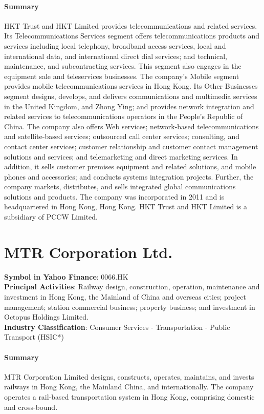 \paragraph{Summary}
HKT Trust and HKT Limited provides telecommunications and related services. Its Telecommunications Services segment offers telecommunications products and services including local telephony, broadband access services, local and international data, and international direct dial services; and technical, maintenance, and subcontracting services. This segment also engages in the equipment sale and teleservices businesses. The company's Mobile segment provides mobile telecommunications services in Hong Kong. Its Other Businesses segment designs, develops, and delivers communications and multimedia services in the United Kingdom, and Zhong Ying; and provides network integration and related services to telecommunications operators in the People's Republic of China. The company also offers Web services; network-based telecommunications and satellite-based services; outsourced call center services; consulting, and contact center services; customer relationship and customer contact management solutions and services; and telemarketing and direct marketing services. In addition, it sells customer premises equipment and related solutions, and mobile phones and accessories; and conducts systems integration projects. Further, the company markets, distributes, and sells integrated global communications solutions and products. The company was incorporated in 2011 and is headquartered in Hong Kong, Hong Kong. HKT Trust and HKT Limited is a subsidiary of PCCW Limited.


\section{MTR Corporation Ltd.}
\textbf{Symbol in Yahoo Finance}: 0066.HK\\
\textbf{Principal Activities}: Railway design, construction, operation, maintenance and investment in Hong Kong, the Mainland of China and overseas cities; project management; station commercial business; property business; and investment in Octopus Holdings Limited.\\
\textbf{Industry Classification}: Consumer Services - Transportation - Public Transport (HSIC*)
\paragraph{Summary}
MTR Corporation Limited designs, constructs, operates, maintains, and invests railways in Hong Kong, the Mainland China, and internationally. The company operates a rail-based transportation system in Hong Kong, comprising domestic and cross-bound.



